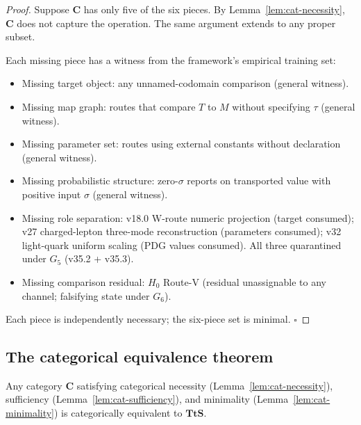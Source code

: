 \begin{proof}
Suppose $\mathbf{C}$ has only five of the six pieces. By Lemma~\ref{lem:cat-necessity}, $\mathbf{C}$ does not capture the operation. The same argument extends to any proper subset.

Each missing piece has a witness from the framework's empirical training set:
\begin{itemize}
\item Missing target object: any unnamed-codomain comparison (general witness).
\item Missing map graph: routes that compare $T$ to $M$ without specifying $\tau$ (general witness).
\item Missing parameter set: routes using external constants without declaration (general witness).
\item Missing probabilistic structure: zero-$\sigma$ reports on transported value with positive input $\sigma$ (general witness).
\item Missing role separation: v18.0 W-route numeric projection (target consumed); v27 charged-lepton three-mode reconstruction (parameters consumed); v32 light-quark uniform scaling (PDG values consumed). All three quarantined under $G_5$ (v35.2 + v35.3).
\item Missing comparison residual: $H_0$ Route-V (residual unassignable to any channel; falsifying state under $G_6$).
\end{itemize}

Each piece is independently necessary; the six-piece set is minimal. $\square$
\end{proof}

\subsection{The categorical equivalence theorem}
\label{subsec:cat-equivalence}

\begin{theorem}
\label{thm:cat-uniqueness}
Any category $\mathbf{C}$ satisfying categorical necessity (Lemma~\ref{lem:cat-necessity}), sufficiency (Lemma~\ref{lem:cat-sufficiency}), and minimality (Lemma~\ref{lem:cat-minimality}) is categorically equivalent to $\mathbf{TtS}$.
\end{theorem}

